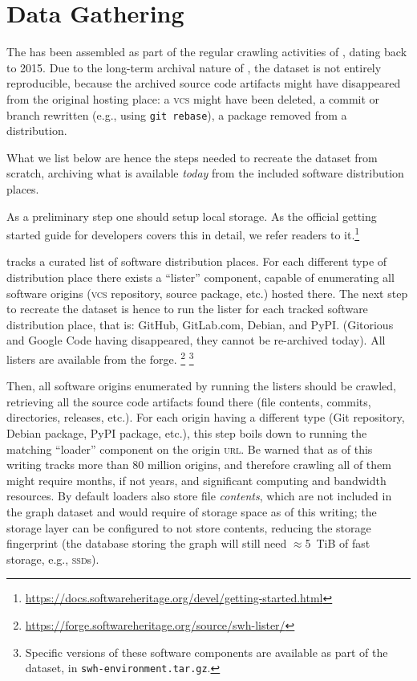 \section{Data Gathering}
\label{sec:gathering}

The \SWHGD has been assembled as part of the regular crawling activities of
\SWH, dating back to 2015. Due to the long-term archival
nature of \SWH, the dataset is not entirely reproducible, because the archived
source code artifacts might have disappeared from the original hosting place: a
\textsc{vcs} might have been deleted, a commit or branch rewritten (e.g., using
\texttt{git rebase}), a package removed from a distribution.

What we list below are hence the steps needed to recreate the dataset from
scratch, archiving what is available \emph{today} from the included software
distribution places.

As a preliminary step one should setup local storage. As the official getting
started guide for \SWH developers
covers this in detail, we refer readers to it.\footnote{\url{https://docs.softwareheritage.org/devel/getting-started.html}}

\SWH tracks a curated list of software distribution places. For each different
type of distribution place there exists a ``lister'' component, capable of
enumerating all software origins (\textsc{vcs} repository, source package, etc.) hosted
there. The next step to recreate the dataset is hence to run the lister for
each tracked software distribution place, that is: GitHub, GitLab.com, Debian,
and PyPI.
(Gitorious and Google Code having disappeared, they cannot be re-archived
today). All listers are available from the \SWH forge.%
\footnote{\url{https://forge.softwareheritage.org/source/swh-lister/}}%
\footnote{Specific versions of these software components are available as part
of the dataset, in \texttt{swh-environment.tar.gz}.}

Then, all software origins enumerated by running the listers should be crawled,
retrieving all the source code artifacts found there (file contents, commits,
directories, releases, etc.). For each origin having a different type (Git
repository, Debian package, PyPI package, etc.), this step boils down to
running the matching ``loader'' component on the origin
\textsc{url}.
Be warned that as of this writing \SWH tracks more than 80 million origins,
and therefore
crawling all of them might require months, if not years, and significant
computing and bandwidth resources. By default loaders also store file
\emph{contents}, which are not included in the graph dataset and would require
 of storage space as of this writing; the storage layer can be
configured to not store contents, reducing the storage fingerprint (the
database storing the graph will still need $\approx$5~TiB of fast storage, e.g.,
\textsc{ssd}s).

